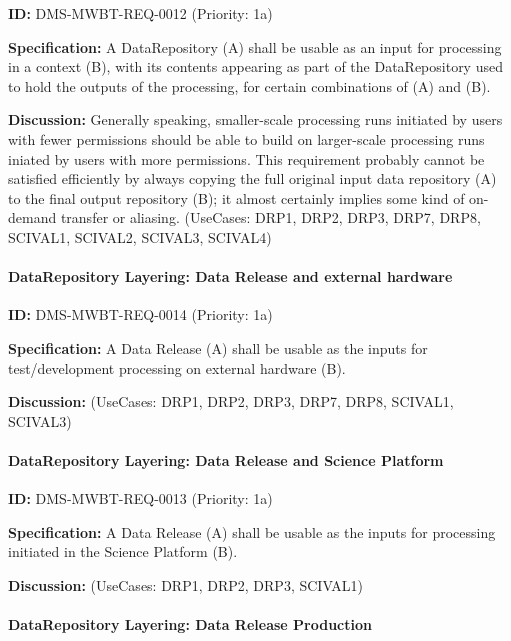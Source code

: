 \documentclass[SE,toc,lsstdraft]{lsstdoc}
\begin{document}
\label{DMS-MWBT-REQ-0012}
\textbf{ID:} DMS-MWBT-REQ-0012 (Priority: 1a)

\textbf{Specification:}
A DataRepository (A) shall be usable as an input for processing in a context (B), with its contents appearing as part of the DataRepository used to hold the outputs of the processing, for certain combinations of (A) and (B).

\textbf{Discussion:}
Generally speaking, smaller-scale processing runs initiated by users with fewer permissions should be able to build on larger-scale processing runs iniated by users with more permissions. This requirement probably cannot be satisfied efficiently by always copying the full original input data repository (A) to the final output repository (B); it almost certainly implies some kind of on-demand transfer or aliasing. (UseCases: DRP1, DRP2, DRP3, DRP7, DRP8, SCIVAL1, SCIVAL2, SCIVAL3, SCIVAL4)

\paragraph{DataRepository Layering: Data Release and external hardware}\hfill  %

\label{DMS-MWBT-REQ-0014}
\textbf{ID:} DMS-MWBT-REQ-0014 (Priority: 1a)

\textbf{Specification:}
A Data Release (A) shall be usable as the inputs for test/development processing on external hardware (B).

\textbf{Discussion:}
(UseCases: DRP1, DRP2, DRP3, DRP7, DRP8, SCIVAL1, SCIVAL3)

\paragraph{DataRepository Layering: Data Release and Science Platform}\hfill  %

\label{DMS-MWBT-REQ-0013}
\textbf{ID:} DMS-MWBT-REQ-0013 (Priority: 1a)

\textbf{Specification:}
A Data Release (A) shall be usable as the inputs for processing initiated in the Science Platform (B).

\textbf{Discussion:}
(UseCases: DRP1, DRP2, DRP3, SCIVAL1)

\paragraph{DataRepository Layering: Data Release Production}\hfill  %
\end{document}
